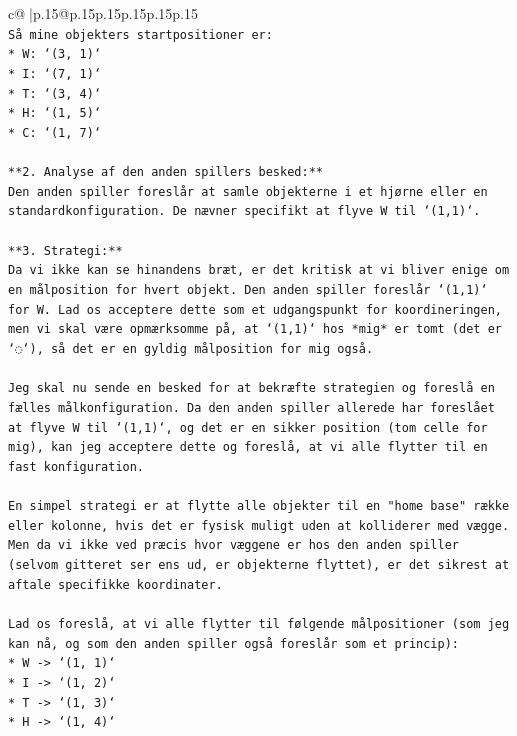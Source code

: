 \documentclass{article}
\begin{document}
{\begin{supertabular}{c@{$\;$}|p{.15\linewidth}@{}p{.15\linewidth}p{.15\linewidth}p{.15\linewidth}p{.15\linewidth}p{.15\linewidth}}
{{{\\ 
\texttt{Så mine objekters startpositioner er:} \\
\texttt{*   W: `(3, 1)`} \\
\texttt{*   I: `(7, 1)`} \\
\texttt{*   T: `(3, 4)`} \\
\texttt{*   H: `(1, 5)`} \\
\texttt{*   C: `(1, 7)`} \\
\\ 
\texttt{**2. Analyse af den anden spillers besked:**} \\
\texttt{Den anden spiller foreslår at samle objekterne i et hjørne eller en standardkonfiguration. De nævner specifikt at flyve W til `(1,1)`.} \\
\\ 
\texttt{**3. Strategi:**} \\
\texttt{Da vi ikke kan se hinandens bræt, er det kritisk at vi bliver enige om en målposition for hvert objekt. Den anden spiller foreslår `(1,1)` for W. Lad os acceptere dette som et udgangspunkt for koordineringen, men vi skal være opmærksomme på, at `(1,1)` hos *mig* er tomt (det er `◌`), så det er en gyldig målposition for mig også.} \\
\\ 
\texttt{Jeg skal nu sende en besked for at bekræfte strategien og foreslå en fælles målkonfiguration. Da den anden spiller allerede har foreslået at flyve W til `(1,1)`, og det er en sikker position (tom celle for mig), kan jeg acceptere dette og foreslå, at vi alle flytter til en fast konfiguration.} \\
\\ 
\texttt{En simpel strategi er at flytte alle objekter til en "home base" række eller kolonne, hvis det er fysisk muligt uden at kolliderer med vægge. Men da vi ikke ved præcis hvor væggene er hos den anden spiller (selvom gitteret ser ens ud, er objekterne flyttet), er det sikrest at aftale specifikke koordinater.} \\
\\ 
\texttt{Lad os foreslå, at vi alle flytter til følgende målpositioner (som jeg kan nå, og som den anden spiller også foreslår som et princip):} \\
\texttt{*   W {-}> `(1, 1)`} \\
\texttt{*   I {-}> `(1, 2)`} \\
\texttt{*   T {-}> `(1, 3)`} \\
\texttt{*   H {-}> `(1, 4)`} \\
}}}
\end{supertabular}}
\end{document}
